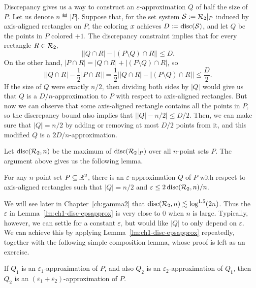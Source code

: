 Discrepancy gives us a way to construct an $\varepsilon$-approximation $Q$ of half the size of $P$. Let us denote $n\eqdef |P|$. Suppose that, for the set system $\mathcal{S} := \mathcal{R}_2|_P$ induced by axis-aligned rectangles on $P$, the coloring $x$ achieves $D := \operatorname{disc}(\mathcal{S})$, and let $Q$ be the points in $P$ colored $+1$. The discrepancy constraint implies that for every rectangle $R \in \mathcal{R}_2$,
\[
\Big||Q\cap R| - |(P\setminus Q) \cap R|\Big| \le D.
\]
On the other hand, $|P\cap R| = |Q\cap R| + |(P\setminus Q) \cap R|$, so
\[
\Big||Q\cap R| - \frac12 |P \cap R|\Big|
= 
\frac12 \Big||Q\cap R| - |(P\setminus Q) \cap R|\Big| \le \frac{D}{2}.
\]
If the size of $Q$ were exactly $n/2$, then dividing both sides by $|Q|$ would give us that $Q$ is a $D/n$-approximation to $P$ with respect to axis-aligned rectangles. But now we can observe that some axis-aligned rectangle contains all the points in $P$, so the discrepancy bound also implies that $\left||Q| -  n/2\right| \le D/2$. Then, we can make sure that $|Q| = n/2$ by adding or removing at most $D/2$ points from it, and this modified $Q$ is a $2D/n$-approximation. 

Let $\operatorname{disc}(\mathcal{R}_2,n)$ be the maximum of $\operatorname{disc}(\mathcal{R}_2|_P)$ over all $n$-point sets $P$. The argument above gives us the following lemma.

\begin{lemma}\label{lm:ch1-disc-epsapprox}
    For any $n$-point set $P\subseteq \mathbb{R}^2$, there is an $\varepsilon$-approximation $Q$ of $P$ with respect to axis-aligned rectangles such that $|Q| = n/2$ and $\varepsilon\le 2\operatorname{disc}(\mathcal{R}_2,n)/n$.
\end{lemma}

We will see later in Chapter~\ref{ch:gamma2} that $\operatorname{disc}(\mathcal{R}_2, n) \lesssim \log^{1.5}(2n)$.
Thus the $\varepsilon$ in Lemma~\ref{lm:ch1-disc-epsapprox} is very close to $0$ when $n$ is large. Typically, however, we can settle for a constant $\varepsilon$, but would like $|Q|$ to only depend on $\varepsilon$. We can achieve this by applying Lemma~\ref{lm:ch1-disc-epsapprox} repeatedly, together with the following simple composition lemma, whose proof is left as an exercise.

\begin{lemma}\label{lm:ch1-epsapprox-composition}
    If $Q_1$ is an $\varepsilon_1$-approximation of $P$, and also $Q_2$ is an $\varepsilon_2$-approximation of $Q_1$, then $Q_2$ is an $(\varepsilon_1 + \varepsilon_2)$-approximation of $P$.
\end{lemma}

